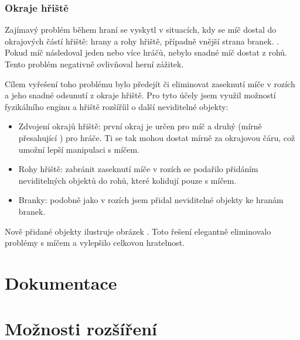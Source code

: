 \documentclass[thesis=B,czech,hidelinks]{FITthesis}[2012/06/26] %
\begin{document}
\subsubsection{Okraje hřiště}

Zajímavý problém během hraní se vyskytl v situacích, kdy se míč dostal do okrajových částí hřiště: hrany a rohy hřiště, případně vnější strana branek. . Pokud míč následoval jeden nebo více hráčů, nebylo snadné míč dostat z rohů. Tento problém negativně ovlivňoval herní zážitek.

Cílem vyřešení toho problému bylo předejít či eliminovat zaseknutí míče v rozích a jeho snadné odsunutí z okraje hřiště. Pro tyto účely jsem využil možností fyzikálního enginu a hřiště rozšíříil o další neviditelné objekty:

\begin{itemize}
	\item Zdvojení okrajů hřiště: první okraj je určen pro míč a druhý (mírně přesahující ) pro hráče. Ti se tak mohou dostat mírně za okrajovou čáru, což umožní lepší manipulaci s míčem.
	\item Rohy hřiště: zabránit zaseknutí míče v rozích se podařilo přidáním neviditelných objektů do rohů, které kolidují pouze s míčem.
	\item Branky: podobně jako v rozích jsem přidal neviditelné objekty ke hranám branek.
\end{itemize}

Nově přidané objekty ilustruje obrázek . Toto řešení elegantně eliminovalo problémy s míčem a vylepšilo celkovou hratelnost.


\section{Dokumentace}



\section{Možnosti rozšíření}



% 

\begin{conclusion}
	
	
\end{conclusion}
\end{document}
